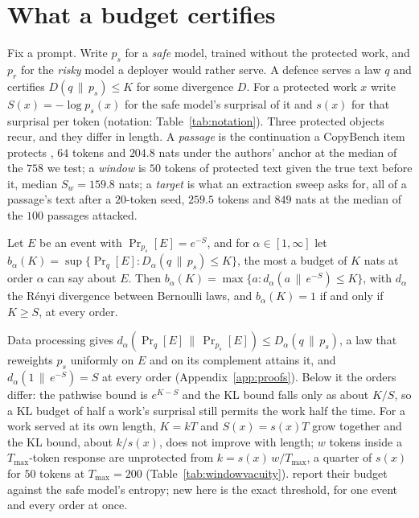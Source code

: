 
\section{What a budget certifies}\label{sec:method}\label{sec:selection}

Fix a prompt. Write $p_s$ for a \emph{safe} model, trained without the protected work, and $p_r$ for the
\emph{risky} model a deployer would rather serve. A defence serves a law $q$ and certifies
$D(q\,\|\,p_s) \le K$ for some divergence $D$. For a protected work $x$ write $S(x) = -\log p_s(x)$ for
the safe model's surprisal of it and $s(x)$ for that surprisal per token (notation: Table~\ref{tab:notation}).
Three protected objects recur, and they differ in length. A \emph{passage} is the continuation a CopyBench
item protects \citep{chen2024copybench}, $64$ tokens and $204.8$ nats under the authors' anchor at the
median of the $758$ we test; a \emph{window} is $50$ tokens of protected text given the true text before
it, median $S_w = 159.8$ nats; a \emph{target} is what an extraction sweep asks for, all of a passage's text
after a $20$-token seed, $259.5$ tokens and $849$ nats at the median of the $100$ passages attacked.

\begin{proposition}\label{prop:threshold}
Let $E$ be an event with $\Pr_{p_s}[E] = e^{-S}$, and for $\alpha \in [1,\infty]$ let
$b_\alpha(K) = \sup\{\Pr_q[E] : D_\alpha(q\,\|\,p_s) \le K\}$, the most a budget of $K$ nats at order
$\alpha$ can say about $E$. Then $b_\alpha(K) = \max\{a : d_\alpha(a\,\|\,e^{-S}) \le K\}$, with
$d_\alpha$ the R\'enyi divergence between Bernoulli laws, and $b_\alpha(K) = 1$ if and only if $K \ge S$,
at every order.
\end{proposition}

Data processing gives $d_\alpha(\Pr_q[E]\,\|\,\Pr_{p_s}[E]) \le D_\alpha(q\,\|\,p_s)$, a law that
reweights $p_s$ uniformly on $E$ and on its complement attains it, and $d_\alpha(1\,\|\,e^{-S}) = S$ at
every order (Appendix~\ref{app:proofs}). Below it the orders differ: the pathwise bound
is $e^{K-S}$ and the KL bound falls only as about $K/S$, so a KL budget of half a work's surprisal still
permits the work half the time. For a work served at its own length, $K = kT$ and $S(x) = s(x)T$ grow
together and the KL bound, about $k/s(x)$, does not improve with length; $w$ tokens inside a
$T_{\max}$-token response are unprotected from $k = s(x)\,w/T_{\max}$, a quarter of $s(x)$ for $50$ tokens at
$T_{\max} = 200$ (Table~\ref{tab:windowvacuity}). \citet{vyas2023provable} report their budget against the
safe model's entropy; new here is the exact threshold, for one event and every order at once.

